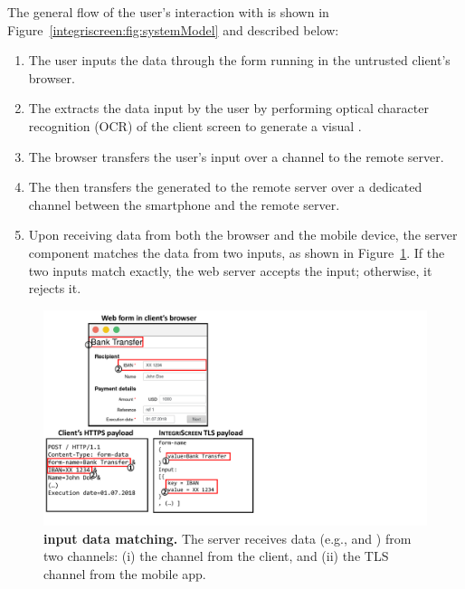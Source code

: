 The general flow of the user's interaction with \sysname is shown in Figure~\ref{integriscreen:fig:systemModel} and described below:
\begin{enumerate} %
  \item[\one] The user inputs the data through the form running in the untrusted client's browser.

  \item[\two] The \app extracts the data input by the user by performing optical character recognition (OCR) of the client screen to generate a visual \POI.

  \item[\three] The browser transfers the user's input over a \https channel to the remote server.

  \item[\four] The \app then transfers the generated \POI to the remote server over a dedicated \tls channel between the smartphone and the remote server.

  \item[\five] Upon receiving data from both the browser and the mobile device, the \name server component matches the data from two inputs, as shown in Figure~\ref{fig:traceMatching}.
  If the two inputs match exactly, the web server accepts the input; otherwise, it rejects it.
\end{enumerate}



\begin{figure}[t]
    \centering
    \includegraphics[trim={0 1cm 15cm 0},clip,width=0.7\linewidth]{chapters/IntegriScreen/img/inputMatching.pdf}
\caption[\sysname input data matching.]{\textbf{\sysname input data matching.}
        The server receives data (e.g., \one and \two) from two channels: (i) the \https channel from the client, and (ii) the TLS channel from the \name mobile app.}
    \label{fig:traceMatching}
    \vspace{0.3cm}
\end{figure}



